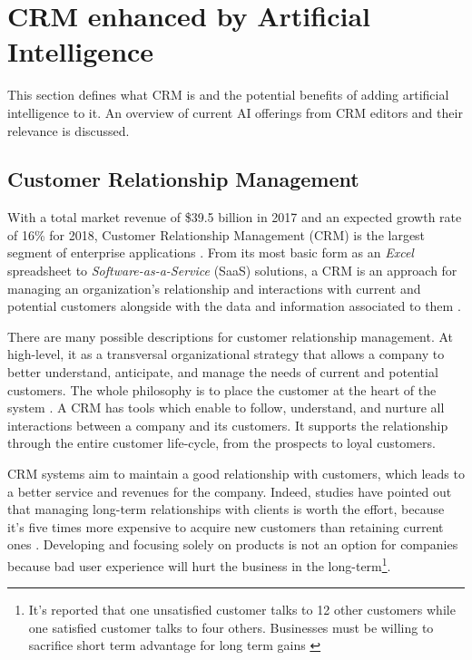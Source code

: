 \chapter{CRM enhanced by Artificial Intelligence}
\label{sec:crm-ai}

This section defines what CRM is and the potential benefits of adding artificial intelligence to it. An overview of current AI offerings from CRM editors and their relevance is discussed.


\section{Customer Relationship Management} \label{sec:crm-def}


With a total market revenue of \$39.5 billion in 2017 and an expected growth rate of 16\% for 2018, Customer Relationship Management (CRM) is the largest segment of enterprise applications \cite{gartner-crm-market}. From its most basic form as an \textit{Excel} spreadsheet to \textit{Software-as-a-Service} (SaaS) solutions, a CRM is an approach for managing an organization's relationship and interactions with current and potential customers alongside with the data and information associated to them \cite{salesforce:CRM-def}.

There are many possible descriptions for customer relationship management. At high-level, it as a transversal organizational strategy that allows a company to better understand, anticipate, and manage the needs of current and potential customers. The whole philosophy is to place the customer at the heart of the system \cite{brown2000customer}\nocite{biedermann-crm}. A CRM has tools which enable to follow, understand, and nurture all interactions between a company and its customers. It supports the relationship through the entire customer life-cycle, from the prospects to loyal customers. 

CRM systems aim to maintain a good relationship with customers, which leads to a better service and revenues for the company. Indeed, studies have pointed out that managing long-term relationships with clients is worth the effort, because it's five times more expensive to acquire new customers than retaining current ones \cite{crm-facts}. Developing and focusing solely on products is not an option for companies because bad user experience will hurt the business in the long-term\footnote{It's reported that one unsatisfied customer talks to 12 other customers while one satisfied customer talks to four others. Businesses must be willing to sacrifice short term advantage for long term gains \cite{crm-facts,bennet,crm-essay}}.

